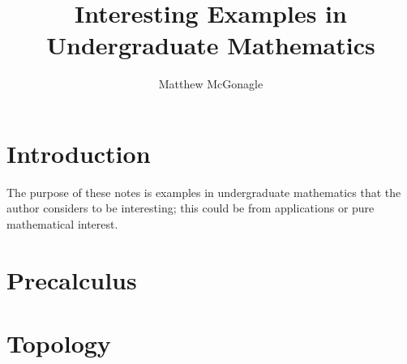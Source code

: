 \documentclass{article}
\title{Interesting Examples in Undergraduate Mathematics}
\author{Matthew McGonagle}
\begin{document}
\maketitle

\tableofcontents

\section{Introduction}

The purpose of these notes is examples in undergraduate mathematics that the author considers to be interesting; this could be from applications or pure mathematical interest. 

\section{Precalculus}














\section{Topology}


{}

\end{document}
